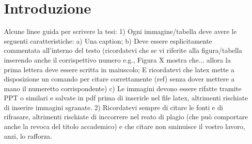 \chapter{Introduzione}

\begin{comment}
Ciò che viene scritto in questo enviroment non sarà mostrato nel pdf.
Questo comando è utile per nascondere un intero paragrafo senza eliminarlo dal file sorgente. 
\end{comment}
Alcune linee guida per scrivere la tesi: 1) Ogni immagine/tabella deve avere le seguenti caratteristiche: a) Una caption; b) Deve essere esplicitamente commentata all'interno del testo (ricordatevi che se vi riferite alla figura/tabella inserendo anche il corrispettivo numero e.g., Figura X mostra che... allora la prima lettera deve essere scritta in maiuscolo; E ricordatevi che latex mette a disposizione un comando per citare correttamente (ref) senza dover mettere a mano il numeretto corrispondente) c) Le immagini devono essere rifatte tramite PPT o similari e salvate in pdf prima di inserirle nel file latex, altrimenti rischiate di inserire immagini sgranate. 2) Ricordatevi sempre di citare le fonti e di rifrasare, altrimenti rischiate di inccorrere nel reato di plagio (che può comportare anche la revoca del titolo accademico) e che citare non sminuisce il vostro lavoro, anzi, lo rafforza.
